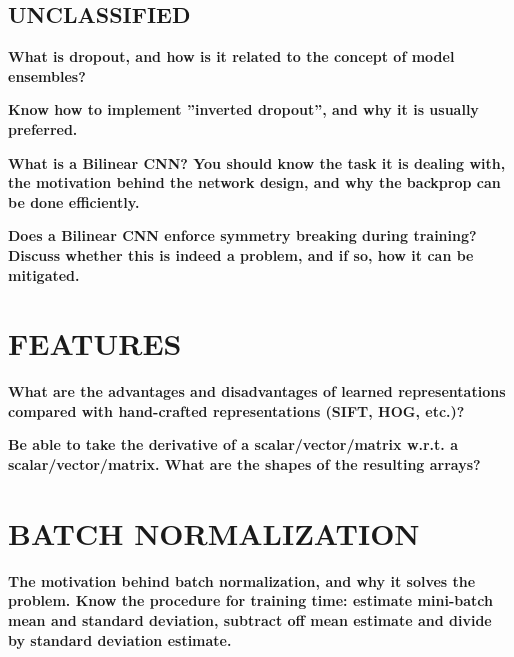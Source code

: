 \documentclass[10pt,letterpaper]{article}
\begin{document}
\subsection{UNCLASSIFIED}

\subitem \textbf{ What is dropout, and how is it related to the concept of model ensembles?}
\begin{solution}
\end{solution}

\subitem \textbf{ Know how to implement ”inverted dropout”, and why it is usually preferred.}
\begin{solution}
\end{solution}

\subitem \textbf{ What is a Bilinear CNN? You should know the task it is dealing with, the motivation behind the network design, and why the backprop can be done efficiently.}
\begin{solution}
\end{solution}
\subitem \textbf{ Does a Bilinear CNN enforce symmetry breaking during training? Discuss whether this is indeed a problem, and if so, how it can be mitigated.}
\begin{solution}
\end{solution}

\section{FEATURES}
\subitem \textbf{ What are the advantages and disadvantages of learned representations compared with hand-crafted representations (SIFT, HOG, etc.)?}
\begin{solution}
\end{solution}

\subitem \textbf{ Be able to take the derivative of a scalar/vector/matrix w.r.t. a scalar/vector/matrix. What are the shapes of the resulting arrays? }
\begin{solution}
\end{solution}


\section{BATCH NORMALIZATION}
\subitem \textbf{ The motivation behind batch normalization, and why it solves the problem. Know the procedure for training time: estimate mini-batch mean and standard deviation, subtract off mean estimate and divide by standard deviation estimate.}
\begin{solution}
\end{solution}

\end{document}
